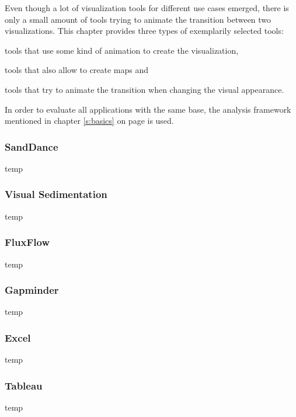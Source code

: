 Even though a lot of visualization tools for different use cases emerged, there is only a small amount of tools trying to animate the transition between two visualizations. This chapter provides three types of exemplarily selected tools:

\begin{enumerate*}
\item tools that use some kind of animation to create the visualization,
\item tools that also allow to create maps and
\item tools that try to animate the transition when changing the visual appearance.
\end{enumerate*}

In order to evaluate all applications with the same base, the analysis framework mentioned in chapter \ref{s:basics} on page \pageref{s:basics} is used.

\subsubsection{SandDance}


temp

\subsubsection{Visual Sedimentation}
temp 


\subsubsection{FluxFlow}
temp 

\subsubsection{Gapminder}
temp

\subsubsection{Excel}
temp

\subsubsection{Tableau}
temp 



